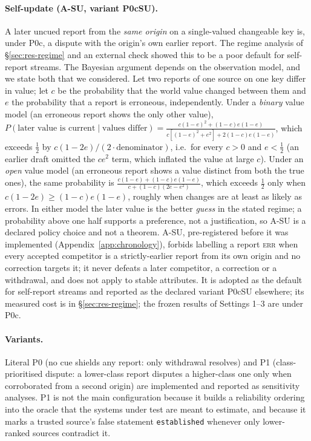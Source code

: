 \paragraph{Self-update (A-SU, variant P0cSU).} A later uncued report from the \emph{same origin} on a single-valued changeable key is, under P0c, a dispute with the origin's own earlier report. The regime analysis of \S\ref{sec:res-regime} and an external check showed this to be a poor default for self-report streams. The Bayesian argument depends on the observation model, and we state both that we considered. Let two reports of one source on one key differ in value; let $c$ be the probability that the world value changed between them and $e$ the probability that a report is erroneous, independently. Under a \emph{binary} value model (an erroneous report shows the only other value), $P(\text{later value is current}\mid\text{values differ})=\frac{c(1-e)^2+(1-c)e(1-e)}{c[(1-e)^2+e^2]+2(1-c)e(1-e)}$, which exceeds $\tfrac12$ by $c(1-2e)/(2\cdot\text{denominator})$, i.e.\ for every $c>0$ and $e<\tfrac12$ (an earlier draft omitted the $ce^2$ term, which inflated the value at large $c$). Under an \emph{open} value model (an erroneous report shows a value distinct from both the true ones), the same probability is $\frac{c(1-e)+(1-c)e(1-e)}{c+(1-c)(2e-e^2)}$, which exceeds $\tfrac12$ only when $c(1-2e)\ge(1-c)e(1-e)$, roughly when changes are at least as likely as errors. In either model the later value is the better \emph{guess} in the stated regime; a probability above one half supports a preference, not a justification, so A-SU is a declared policy choice and not a theorem. A-SU, pre-registered before it was implemented (Appendix~\ref{app:chronology}), forbids labelling a report \textsc{err} when every accepted competitor is a strictly-earlier report from its own origin and no correction targets it; it never defeats a later competitor, a correction or a withdrawal, and does not apply to stable attributes. It is adopted as the default for self-report streams and reported as the declared variant P0cSU elsewhere; its measured cost is in \S\ref{sec:res-regime}; the frozen results of Settings 1--3 are under P0c.

\paragraph{Variants.} Literal P0 (no cue shields any report: only withdrawal resolves) and P1 (class-prioritised dispute: a lower-class report disputes a higher-class one only when corroborated from a second origin) are implemented and reported as sensitivity analyses. P1 is not the main configuration because it builds a reliability ordering into the oracle that the systems under test are meant to estimate, and because it marks a trusted source's false statement \texttt{established} whenever only lower-ranked sources contradict it.
